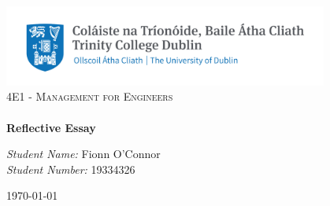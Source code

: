 \begin{titlepage}
    \vbox{ }
    \vbox{ }
    \begin{center}
        \includegraphics[width = 0.8\textwidth]{./images/trinity.png} \\ [1cm]
        \textsc{\LARGE 4E1 - Management for Engineers} \\ [6.5cm]

        \Hrule \\[0.4cm]
        { \huge \bfseries Reflective Essay} \\ [0.1cm]
        \Hrule 

        \vfill

        \large
        \emph {Student Name: }
        Fionn O'Connor \\[.2cm]
        \emph {Student Number: } 
        19334326
      

        {\large {\today}}


    \end{center}
\end{titlepage}